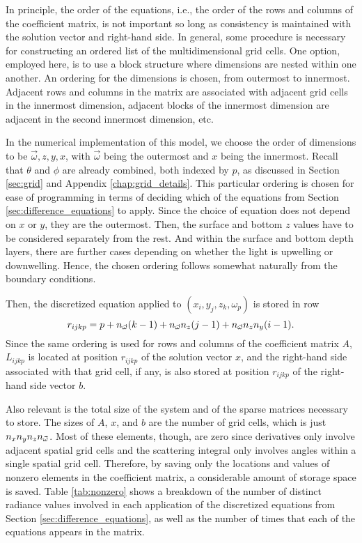 In principle, the order of the equations, i.e., the order of the rows and columns of the coefficient matrix, is not important
so long as consistency is maintained with the solution vector and right-hand side.
In general, some procedure is necessary for constructing an ordered list of the multidimensional grid cells.
One option, employed here, is to use a block structure where dimensions are nested within one another.
An ordering for the dimensions is chosen, from outermost to innermost.
Adjacent rows and columns in the matrix are associated with adjacent grid cells in the innermost dimension,
adjacent blocks of the innermost dimension are adjacent in the second innermost dimension, etc.

In the numerical implementation of this model, we choose the order of dimensions to be $\vec{\omega}, z, y, x$, with $\vec{\omega}$ being the outermost and $x$ being the innermost.
Recall that $\theta$ and $\phi$ are already combined, both indexed by $p$, as discussed in Section \ref{sec:grid} and Appendix \ref{chap:grid_details}.
This particular ordering is chosen for ease of programming in terms of deciding which of the equations from Section \ref{sec:difference_equations} to apply.
Since the choice of equation does not depend on $x$ or $y$, they are the outermost.
Then, the surface and bottom $z$ values have to be considered separately from the rest.
And within the surface and bottom depth layers, there are further cases depending on whether the light is upwelling or downwelling.
Hence, the chosen ordering follows somewhat naturally from the boundary conditions.

Then, the discretized equation applied to $(x_i, y_j, z_k, \omega_p)$ is stored in row
\begin{equation*}
  r_{ijkp} = p + {n_{\vec{\omega}}} (k-1) + {n_{\vec{\omega}}} n_z (j-1) + {n_{\vec{\omega}}} n_z n_y (i-1).
\end{equation*}
Since the same ordering is used for rows and columns of the coefficient matrix $A$, $L_{ijkp}$ is located at position $r_{ijkp}$ of the solution vector $x$,
and the right-hand side associated with that grid cell, if any, is also stored at position $r_{ijkp}$ of the right-hand side vector $b$.

Also relevant is the total size of the system and of the sparse matrices necessary to store.
The sizes of $A$, $x$, and $b$ are the number of grid cells, which is just $n_xn_yn_z{n_{\vec{\omega}}}$.
Most of these elements, though, are zero since derivatives only involve adjacent spatial grid cells and the scattering integral only involves angles within a single spatial grid cell.
Therefore, by saving only the locations and values of nonzero elements in the coefficient matrix, a considerable amount of storage space is saved.
Table \ref{tab:nonzero} shows a breakdown of the number of distinct radiance values involved in each application of the discretized equations from Section \ref{sec:difference_equations}, as well as the number of times that each of the equations appears in the matrix.

